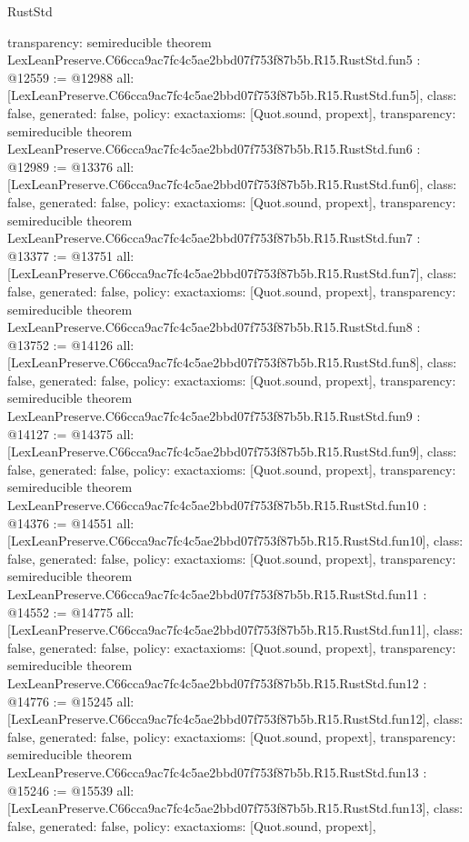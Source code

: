 \begin{lexlean}{RustStd}
\begin{coremodule}
{  transparency: semireducible
}
theorem LexLeanPreserve.C66cca9ac7fc4c5ae2bbd07f753f87b5b.R15.RustStd.fun5 : @12559 := @12988 {
  all: [LexLeanPreserve.C66cca9ac7fc4c5ae2bbd07f753f87b5b.R15.RustStd.fun5],
  class: false,
  generated: false,
  policy: exact{axioms: [Quot.sound, propext]},
  transparency: semireducible
}
theorem LexLeanPreserve.C66cca9ac7fc4c5ae2bbd07f753f87b5b.R15.RustStd.fun6 : @12989 := @13376 {
  all: [LexLeanPreserve.C66cca9ac7fc4c5ae2bbd07f753f87b5b.R15.RustStd.fun6],
  class: false,
  generated: false,
  policy: exact{axioms: [Quot.sound, propext]},
  transparency: semireducible
}
theorem LexLeanPreserve.C66cca9ac7fc4c5ae2bbd07f753f87b5b.R15.RustStd.fun7 : @13377 := @13751 {
  all: [LexLeanPreserve.C66cca9ac7fc4c5ae2bbd07f753f87b5b.R15.RustStd.fun7],
  class: false,
  generated: false,
  policy: exact{axioms: [Quot.sound, propext]},
  transparency: semireducible
}
theorem LexLeanPreserve.C66cca9ac7fc4c5ae2bbd07f753f87b5b.R15.RustStd.fun8 : @13752 := @14126 {
  all: [LexLeanPreserve.C66cca9ac7fc4c5ae2bbd07f753f87b5b.R15.RustStd.fun8],
  class: false,
  generated: false,
  policy: exact{axioms: [Quot.sound, propext]},
  transparency: semireducible
}
theorem LexLeanPreserve.C66cca9ac7fc4c5ae2bbd07f753f87b5b.R15.RustStd.fun9 : @14127 := @14375 {
  all: [LexLeanPreserve.C66cca9ac7fc4c5ae2bbd07f753f87b5b.R15.RustStd.fun9],
  class: false,
  generated: false,
  policy: exact{axioms: [Quot.sound, propext]},
  transparency: semireducible
}
theorem LexLeanPreserve.C66cca9ac7fc4c5ae2bbd07f753f87b5b.R15.RustStd.fun10 : @14376 := @14551 {
  all: [LexLeanPreserve.C66cca9ac7fc4c5ae2bbd07f753f87b5b.R15.RustStd.fun10],
  class: false,
  generated: false,
  policy: exact{axioms: [Quot.sound, propext]},
  transparency: semireducible
}
theorem LexLeanPreserve.C66cca9ac7fc4c5ae2bbd07f753f87b5b.R15.RustStd.fun11 : @14552 := @14775 {
  all: [LexLeanPreserve.C66cca9ac7fc4c5ae2bbd07f753f87b5b.R15.RustStd.fun11],
  class: false,
  generated: false,
  policy: exact{axioms: [Quot.sound, propext]},
  transparency: semireducible
}
theorem LexLeanPreserve.C66cca9ac7fc4c5ae2bbd07f753f87b5b.R15.RustStd.fun12 : @14776 := @15245 {
  all: [LexLeanPreserve.C66cca9ac7fc4c5ae2bbd07f753f87b5b.R15.RustStd.fun12],
  class: false,
  generated: false,
  policy: exact{axioms: [Quot.sound, propext]},
  transparency: semireducible
}
theorem LexLeanPreserve.C66cca9ac7fc4c5ae2bbd07f753f87b5b.R15.RustStd.fun13 : @15246 := @15539 {
  all: [LexLeanPreserve.C66cca9ac7fc4c5ae2bbd07f753f87b5b.R15.RustStd.fun13],
  class: false,
  generated: false,
  policy: exact{axioms: [Quot.sound, propext]},
}
\end{coremodule}
\end{lexlean}
